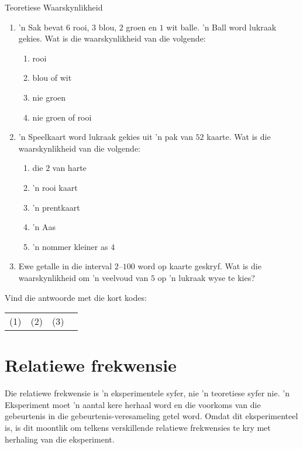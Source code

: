 \begin{exercises}{Teoretiese Waarskynlikheid}
  \begin{enumerate}[itemsep=5pt, label=\textbf{\arabic*}.]
  \item 'n Sak bevat $6$ rooi, $3$ blou, $2$ groen en $1$ wit
    balle. 'n Ball word lukraak gekies. Wat is die waarskynlikheid van die volgende:
    \begin{enumerate}
    \item rooi
    \item blou of wit
    \item nie groen
    \item nie groen of rooi
    \end{enumerate}
  \item 'n Speelkaart word lukraak gekies uit 'n pak van $52$ kaarte. Wat is die waarskynlikheid van die volgende:
    \begin{enumerate}

    \item die $2$ van harte
    \item 'n rooi kaart
    \item 'n prentkaart
    \item 'n Aas
    \item 'n nommer kleiner as $4$
    \end{enumerate}

  \item Ewe getalle in die interval $2$--$100$ word op kaarte geskryf. Wat is
    die waarskynlikheid om 'n veelvoud van $5$ op 'n lukraak wyse te kies?
  \end{enumerate}

  Vind die antwoorde met die kort kodes: \\
  \begin{tabularx}{\textwidth}{XXXX}
    (1) & (2) & (3) \\
  \end{tabularx}
\end{exercises}

\section{Relatiewe frekwensie}


Die relatiewe frekwensie is 'n eksperimentele syfer, nie 'n teoretiese syfer nie. 'n Eksperiment moet 'n aantal kere herhaal word en die voorkoms van die gebeurtenis in die gebeurtenis-veresameling getel word. Omdat dit eksperimenteel is, is dit moontlik om telkens verskillende relatiewe frekwensies te kry met herhaling van die eksperiment.

